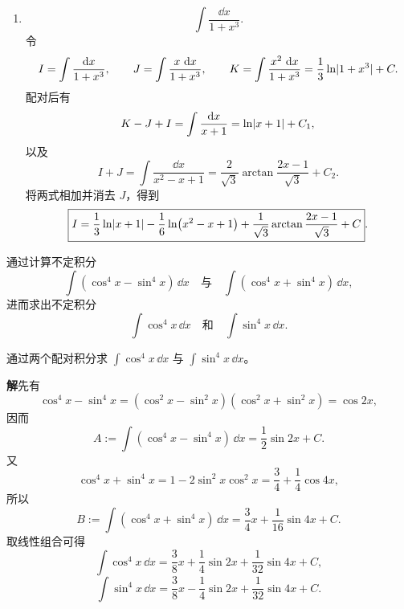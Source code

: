 \begin{xsolution}
\begin{enumerate}[label=(\arabic*)]
    \item
    \[
      \int\frac{\dd x}{1+x^3}.
    \]
    令
    \[
      I=\int\frac{\mathop{}\!\mathrm{d} x}{1+x^3},
      \qquad
      J=\int\frac{x\,\mathop{}\!\mathrm{d} x}{1+x^3},
      \qquad
      K=\int\frac{x^2\,\mathop{}\!\mathrm{d} x}{1+x^3}
       =\frac13\ln\lvert1+x^3\rvert+C.
    \]
    配对后有
    \[
      K-J+I=\int\frac{\mathop{}\!\mathrm{d} x}{x+1}=\ln\lvert x+1\rvert+C_1,
    \]
    以及
    \[
      I+J=\int\frac{\dd x}{x^2-x+1}
      =\frac2{\sqrt3}\arctan\frac{2x-1}{\sqrt3}+C_2.
    \]
    将两式相加并消去 $J$，得到
    \[
      \boxed{
      I=\frac13\ln\lvert x+1\rvert
      -\frac16\ln(x^2-x+1)
      +\frac1{\sqrt3}\arctan\frac{2x-1}{\sqrt3}+C}.
    \]
  \end{enumerate}
\end{xsolution}


\begin{xexercise}[3]
通过计算不定积分
  \[
    \int(\cos^4x-\sin^4x)\,\dd x
    \quad\text{与}\quad
    \int(\cos^4x+\sin^4x)\,\dd x,
  \]
  进而求出不定积分
  \[
    \int\cos^4x\,\dd x
    \quad\text{和}\quad
    \int\sin^4x\,\dd x.
  \]
\end{xexercise}
\begin{xsolution}
通过两个配对积分求 $\int\cos^4x\,\dd x$ 与 $\int\sin^4x\,\dd x$。

  \textbf{解}\quad 先有
  \[
    \cos^4x-\sin^4x=(\cos^2x-\sin^2x)(\cos^2x+\sin^2x)=\cos2x,
  \]
  因而
  \[
    A:=\int(\cos^4x-\sin^4x)\,\dd x
    =\frac12\sin2x+C.
  \]
  又
  \[
    \cos^4x+\sin^4x
    =1-2\sin^2x\cos^2x
    =\frac34+\frac14\cos4x,
  \]
  所以
  \[
    B:=\int(\cos^4x+\sin^4x)\,\dd x
    =\frac34x+\frac1{16}\sin4x+C.
  \]
  取线性组合可得
  \[
    \boxed{
    \int\cos^4x\,\dd x
    =\frac38x+\frac14\sin2x+\frac1{32}\sin4x+C},
  \]
  \[
    \boxed{
    \int\sin^4x\,\dd x
    =\frac38x-\frac14\sin2x+\frac1{32}\sin4x+C}.
  \]
\end{xsolution}


